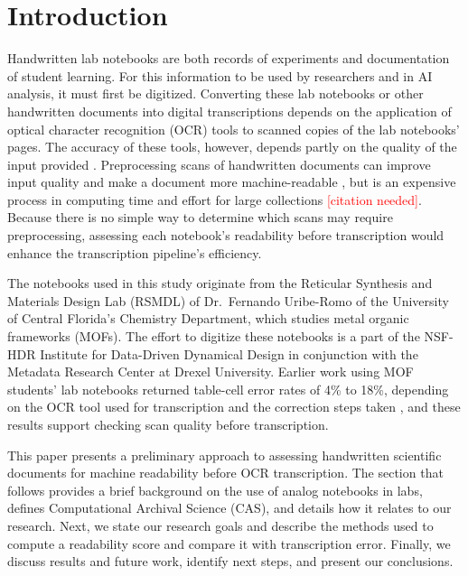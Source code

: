 \documentclass[conference]{IEEEtran}
\newcommand{\todo}[1]{\textcolor{red}{[#1]}}
\begin{document}
\section{Introduction}

Handwritten lab notebooks are both records of experiments and documentation of
student learning. For this information to be used by researchers and in AI
analysis, it must first be digitized. Converting these lab notebooks or other
handwritten documents into digital transcriptions depends on the application of
optical character recognition (OCR) tools to scanned copies of the lab
notebooks' pages. The accuracy of these tools, however, depends partly on the
quality of the input provided \cite{ye2013, alaei2024}. Preprocessing scans of
handwritten documents can improve input quality and make a document more
machine-readable \cite{sauvola2000, gonzalez2018}, but is an expensive process
in computing time and effort for large collections \todo{citation needed}.
Because there is no simple way to determine which scans may require
preprocessing, assessing each notebook's readability before transcription would
enhance the transcription pipeline's efficiency.

The notebooks used in this study originate from the Reticular Synthesis and
Materials Design Lab (RSMDL) of Dr.\ Fernando Uribe-Romo of the University of
Central Florida's Chemistry Department, which studies metal organic frameworks
(MOFs). The effort to digitize these notebooks is a part of the NSF-HDR
Institute for Data-Driven Dynamical Design in conjunction with the Metadata
Research Center at Drexel University. Earlier work using MOF students' lab
notebooks returned table-cell error rates of 4\% to 18\%, depending on the OCR
tool used for transcription and the correction steps taken \cite{pepper2025},
and these results support checking scan quality before transcription.

This paper presents a preliminary approach to assessing handwritten scientific
documents for machine readability before OCR transcription. The section that
follows provides a brief background on the use of analog notebooks in labs,
defines Computational Archival Science (CAS), and details how it relates to our
research. Next, we state our research goals and describe the methods used to
compute a readability score and compare it with transcription error. Finally,
we discuss results and future work, identify next steps, and present our
conclusions.
\end{document}
